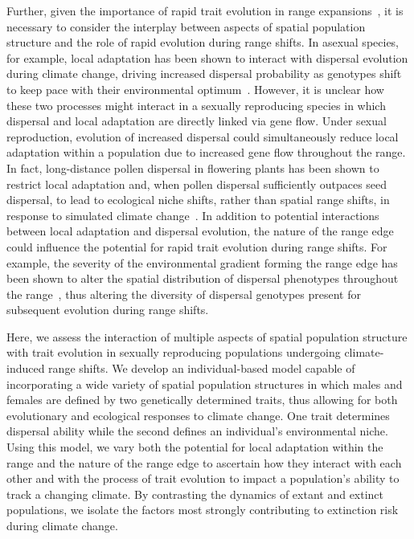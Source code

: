 \documentclass[11pt]{article}
\begin{document}
Further, given the importance of rapid trait evolution in range expansions~\citep{weiss2017rapid, ochocki2017rapid, szHucs2017rapid, shaw2015dispersal, phillips2015evolutionary}, it is necessary to consider the interplay between aspects of spatial population structure and the role of rapid evolution during range shifts. In asexual species, for example, local adaptation has been shown to interact with dispersal evolution during climate change, driving increased dispersal probability as genotypes shift to keep pace with their environmental optimum~\citep{hargreaves2015fitness}. However, it is unclear how these two processes might interact in a sexually reproducing species in which dispersal and local adaptation are directly linked via gene flow. Under sexual reproduction, evolution of increased dispersal could simultaneously reduce local adaptation within a population due to increased gene flow throughout the range. In fact, long-distance pollen dispersal in flowering plants has been shown to restrict local adaptation and, when pollen dispersal sufficiently outpaces seed dispersal, to lead to ecological niche shifts, rather than spatial range shifts, in response to simulated climate change~\citep{aguilee2016pollen}. In addition to potential interactions between local adaptation and dispersal evolution, the nature of the range edge could influence the potential for rapid trait evolution during range shifts. For example, the severity of the environmental gradient forming the range edge has been shown to alter the spatial distribution of dispersal phenotypes throughout the range~\citep{henry2013eco, hargreaves2014evolution}, thus altering the diversity of dispersal genotypes present for subsequent evolution during range shifts.

Here, we assess the interaction of multiple aspects of spatial population structure with trait evolution in sexually reproducing populations undergoing climate-induced range shifts. We develop an individual-based model capable of incorporating a wide variety of spatial population structures in which males and females are defined by two genetically determined traits, thus allowing for both evolutionary and ecological responses to climate change. One trait determines dispersal ability while the second defines an individual's environmental niche. Using this model, we vary both the potential for local adaptation within the range and the nature of the range edge to ascertain how they interact with each other and with the process of trait evolution to impact a population's ability to track a changing climate. By contrasting the dynamics of extant and extinct populations, we isolate the factors most strongly contributing to extinction risk during climate change.
\end{document}
